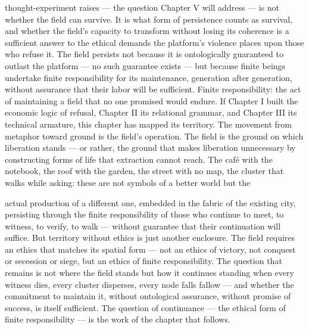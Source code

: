 thought-experiment raises — the question Chapter V will address — is not whether the field can survive. It is what form of persistence counts as survival, and whether the field’s capacity to transform without losing its coherence is a sufficient answer to the ethical demands the platform’s violence places upon those who refuse it. The field persists not because it is ontologically guaranteed to outlast the platform — no such guarantee exists — but because finite beings undertake finite responsibility for its maintenance, generation after generation, without assurance that their labor will be sufficient. Finite responsibility: the act of maintaining a field that no one promised would endure. If Chapter I built the economic logic of refusal, Chapter II its relational grammar, and Chapter III its technical armature, this chapter has mapped its territory. The movement from metaphor toward ground is the field’s operation. The field is the ground on which liberation stands — or rather, the ground that makes liberation unnecessary by constructing forms of life that extraction cannot reach. The café with the notebook, the roof with the garden, the street with no map, the cluster that walks while asking: these are not symbols of a better world but the

actual production of a different one, embedded in the fabric of the existing city, persisting through the finite responsibility of those who continue to meet, to witness, to verify, to walk — without guarantee that their continuation will suffice. But territory without ethics is just another enclosure. The field requires an ethics that matches its spatial form — not an ethics of victory, not conquest or secession or siege, but an ethics of finite responsibility. The question that remains is not where the field stands but how it continues standing when every witness dies, every cluster disperses, every node falls fallow — and whether the commitment to maintain it, without ontological assurance, without promise of success, is itself sufficient. The question of continuance — the ethical form of finite responsibility — is the work of the chapter that follows.
